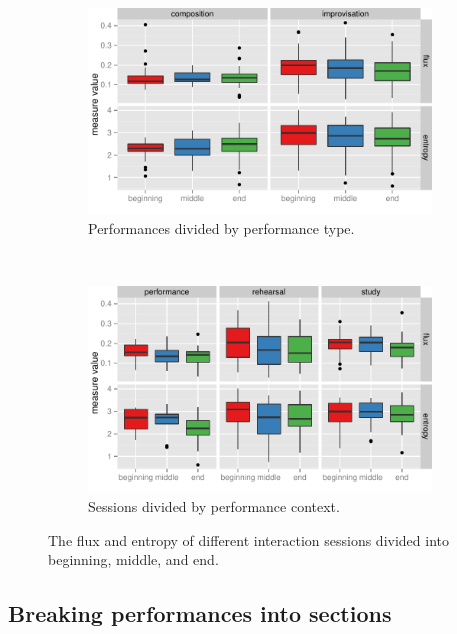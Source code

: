 \documentclass{sigchi}
\begin{document}
\begin{figure}[t!]
    \centering
    \begin{subfigure}[t]{0.5\linewidth}
        \centering
          \includegraphics[width=\linewidth]{figures/type-section-flux-entropy}
          \caption{Performances divided by performance type. \label{fig:type-section-flux-entropy}}
    \end{subfigure}%
    ~ 
    \begin{subfigure}[t]{0.5\linewidth}
        \centering
          \includegraphics[width=\linewidth]{figures/context-section-flux-entropy}
          \caption{Sessions divided by performance context. \label{fig:context-section-flux-entropy}}
    \end{subfigure}
    \caption{The flux and entropy of different interaction sessions
      divided into beginning, middle, and end.}
\end{figure}


\subsection{Breaking performances into sections}
\end{document}
